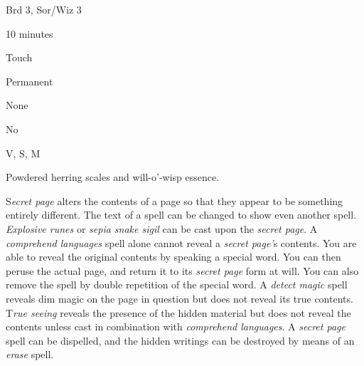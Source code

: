 
\begin{description*}
\item[Level:] Brd 3, Sor/Wiz 3
\item[Casting Time:] 10 minutes
\item[Range:] Touch
\item[Duration:] Permanent
\item[Saving Throw:] None
\item[Spell Resistance:] No
\item[Components:] V, S, M
\item[Arcane Material Component:] Powdered herring scales and will-o'-wisp essence.
\end{description*}

S\textit{ecret page} alters the contents of a page so that they appear to be something
entirely different. The text of a spell can be changed to show even another spell.
\textit{Explosive runes} or \textit{sepia snake sigil} can be cast upon the \textit{secret
page}.
A \textit{comprehend languages} spell alone cannot reveal a \textit{secret page'}s
contents. You are able to reveal the original contents by speaking a special word.
You can then peruse the actual page, and return it to its \textit{secret page} form
at will. You can also remove the spell by double repetition of the special word.
A \textit{detect magic} spell reveals dim magic on the page in question but does
not reveal its true contents. T\textit{rue seeing} reveals the presence of the
hidden material but does not reveal the contents unless cast in combination with
\textit{comprehend languages}. A \textit{secret page} spell can be dispelled, and
the hidden writings can be destroyed by means of an \textit{erase} spell.